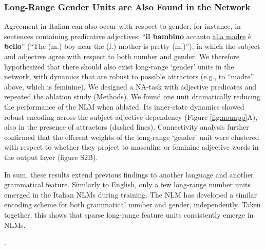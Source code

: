\subsubsection{Long-Range Gender Units are Also Found in the Network }
Agreement in Italian can also occur with respect to gender, for instance, in sentences containing predicative adjectives: ``\textbf{il bambino} accanto \underline{alla madre} \`{e} \textbf{bello}'' (``The (m.) boy near the (f.) mother is pretty (m.)''), in which the subject and adjective agree with respect to both number and gender. We therefore hypothesized that there should also exist long-range `gender' units in the network, with dynamics that are robust to possible attractors (e.g., to ``madre'' above, which is feminine). We designed a NA-task with adjective predicates and repeated the ablation study (Methods). We found one unit dramatically reducing the performance of the NLM when ablated. Its inner-state dynamics showed robust encoding across the subject-adjective dependency (Figure \ref{fig:nounpp}A), also in the presence of attractors (dashed lines). Connectivity analysis further confirmed that the efferent weights of the long-range `gender' unit were clustered with respect to whether they project to masculine or feminine adjective words in the output layer (figure S2B).

\vspace{10pt}
In sum, these results extend previous findings to another language and another grammatical feature. Similarly to English, only a few long-range number units emerged in the Italian NLMs during training. The NLM has developed a similar encoding scheme for both grammatical number and gender, independently. Taken together, this shows that sparse long-range feature units consistently emerge in NLMs.

. 

